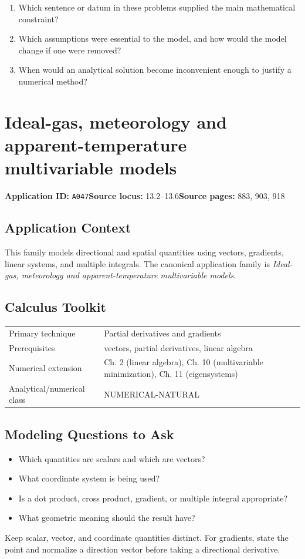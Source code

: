 \documentclass[11pt]{book}
\newcommand{\pid}[1]{\texttt{#1}}
\begin{document}
\begin{reflectionbox}\begin{enumerate}
\item Which sentence or datum in these problems supplied the main mathematical constraint?
\item Which assumptions were essential to the model, and how would the model change if one were removed?
\item When would an analytical solution become inconvenient enough to justify a numerical method?
\end{enumerate}\end{reflectionbox}
\chapter{Ideal-gas, meteorology and apparent-temperature multivariable models}\label{app:A047}
\textbf{Application ID:} \pid{A047}\quad \textbf{Source locus:} 13.2–13.6\quad \textbf{Source pages:} 883, 903, 918
\section*{Application Context}
This family models directional and spatial quantities using vectors, gradients, linear systems, and multiple integrals. The canonical application family is \emph{Ideal-gas, meteorology and apparent-temperature multivariable models}.
\section*{Calculus Toolkit}
\begin{tabularx}{\textwidth}{@{}lX@{}}\toprule
Primary technique & Partial derivatives and gradients \\
Prerequisites & vectors, partial derivatives, linear algebra \\
Numerical extension & Ch. 2 (linear algebra), Ch. 10 (multivariable minimization), Ch. 11 (eigensystems) \\
Analytical/numerical class & NUMERICAL-NATURAL \\
\bottomrule\end{tabularx}
\section*{Modeling Questions to Ask}\begin{itemize}
\item Which quantities are scalars and which are vectors?
\item What coordinate system is being used?
\item Is a dot product, cross product, gradient, or multiple integral appropriate?
\item What geometric meaning should the result have?
\end{itemize}
\begin{errorbox}Keep scalar, vector, and coordinate quantities distinct. For gradients, state the point and normalize a direction vector before taking a directional derivative.\end{errorbox}
\end{document}
